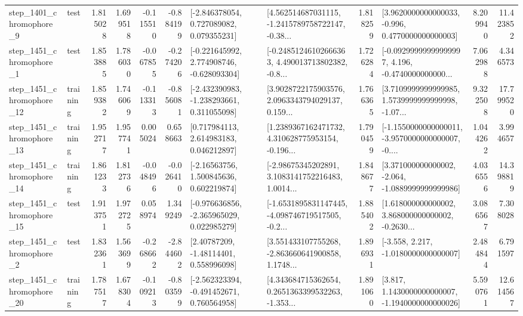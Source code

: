 \begin{tabular}{llrrrrllrlrr}
  step\_1401\_chromophore\_9 &      test &      1.815028 &    1.699518 &     -0.115510 & -0.884199 &    [-2.846378054, 0.727089082, 0.079355231] &  [4.562514687031115, -1.2415789758722147, -0.38... &       1.818259 &   [3.9620000000000033, -0.996, 0.4770000000000003] &            8.209940 &         11.423852 \\
  step\_1451\_chromophore\_1 &      test &      1.853885 &    1.786030 &     -0.067855 & -0.274206 &   [-0.221645992, 2.774908746, -0.628093304] &  [-0.24851246102666363, 4.490013713802382, -0.8... &       1.726284 &  [-0.09299999999999997, 4.196, -0.4740000000000... &            7.062988 &          4.346573 \\
 step\_1451\_chromophore\_12 &  training &      1.859382 &    1.746069 &     -0.113313 & -0.856081 &   [-2.432390983, -1.238293661, 0.311055098] &  [3.9028722175903576, 2.0963343794029137, 0.159... &       1.766365 &  [3.7109999999999985, 1.5739999999999998, -1.07... &            9.322508 &         17.799520 \\
 step\_1451\_chromophore\_13 &  training &      1.952717 &    1.957741 &      0.005024 &  0.658663 &     [0.717984113, 2.614983183, 0.046212897] &  [1.2389367162471732, 4.310628775953154, -0.196... &       1.790459 &  [-1.1550000000000011, -3.9570000000000007, -0.... &            1.044262 &          3.994657 \\
 step\_1451\_chromophore\_14 &  training &      1.861233 &    1.812736 &     -0.048496 & -0.026410 &     [-2.16563756, 1.500845636, 0.602219874] &  [-2.98675345202891, 3.1083141752216483, 1.0014... &       1.848677 &   [3.371000000000002, -2.064, -1.0889999999999986] &            4.036556 &         14.398819 \\
 step\_1451\_chromophore\_15 &      test &      1.913751 &    1.972725 &      0.058974 &  1.349249 &   [-0.976636856, -2.365965029, 0.022985279] &  [-1.6531895831147445, -4.098746719517505, -0.2... &       1.885402 &  [1.618000000000002, 3.868000000000002, -0.2630... &            3.086567 &          7.308028 \\
  step\_1451\_chromophore\_2 &      test &      1.832361 &    1.563699 &     -0.268662 & -2.844602 &      [2.40787209, -1.48114401, 0.558996098] &  [3.551433107755268, -2.863660641900858, 1.1748... &       1.896931 &               [-3.558, 2.217, -1.0180000000000007] &            2.484844 &          6.791597 \\
 step\_1451\_chromophore\_20 &  training &      1.787517 &    1.678304 &     -0.109213 & -0.803599 &   [-2.562323394, -0.491452671, 0.760564958] &  [4.343684715362654, 0.2651363399532263, -1.353... &       1.891060 &   [3.817, 1.1430000000000007, -1.1940000000000026] &            5.590761 &         12.614567 \\

\end{tabular}
